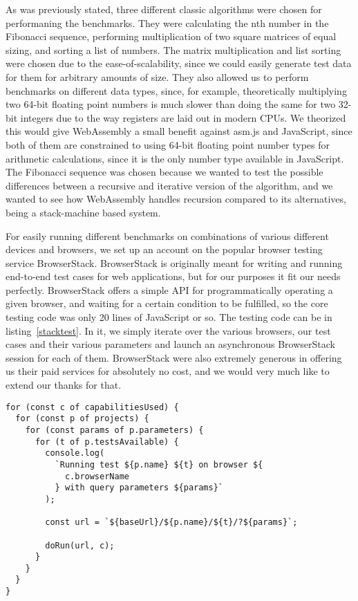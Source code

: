\documentclass[conference]{IEEEtran}
\begin{document}
As was previously stated, three different classic algorithms were chosen for
performaning the benchmarks. They were calculating the nth number in the
Fibonacci sequence, performing multiplication of two square matrices of equal
sizing, and sorting a list of numbers. The matrix multiplication and list
sorting were chosen due to the ease-of-scalability, since we could easily
generate test data for them for arbitrary amounts of size. They also allowed us
to perform benchmarks on different data types, since, for example,
theoretically multiplying two 64-bit floating point numbers is much slower than
doing the same for two 32-bit integers due to the way registers are laid out in
modern CPUs. We theorized this would give WebAssembly a small benefit against
asm.js and JavaScript, since both of them are constrained to using 64-bit
floating point number types for arithmetic calculations, since it is the only
number type available in JavaScript. The Fibonacci sequence was chosen because
we wanted to test the possible differences between a recursive and iterative
version of the algorithm, and we wanted to see how WebAssembly handles
recursion compared to its alternatives, being a stack-machine based system.

For easily running different benchmarks on combinations of various different
devices and browsers, we set up an account on the popular browser testing
service BrowserStack. BrowserStack is originally meant for writing and running
end-to-end test cases for web applications, but for our purposes it fit our
needs perfectly. BrowserStack offers a simple API for programmatically
operating a given browser, and waiting for a certain condition to be fulfilled,
so the core testing code was only 20 lines of JavaScript or so. The testing
code can be in listing~\ref{stacktest}. In it, we simply iterate over the
various browsers, our test cases and their various parameters and launch an
asynchronous BrowserStack session for each of them. BrowserStack were also
extremely generous in offering us their paid services for absolutely no cost,
and we would very much like to extend our thanks for that.

\begin{lstlisting}[caption={BrowserStack testing code},label=stacktest, basicstyle=\scriptsize]
for (const c of capabilitiesUsed) {
  for (const p of projects) {
    for (const params of p.parameters) {
      for (t of p.testsAvailable) {
        console.log(
          `Running test ${p.name} ${t} on browser ${
            c.browserName
          } with query parameters ${params}`
        );

        const url = `${baseUrl}/${p.name}/${t}/?${params}`;

        doRun(url, c);
      }
    }
  }
}
\end{lstlisting}
\end{document}
